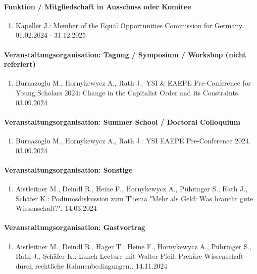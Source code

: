 \paragraph{Funktion / Mitgliedschaft in Ausschuss oder Komitee} 
\begin{enumerate}[leftmargin=*, labelsep=0.5cm] 
 	 \item Kapeller J.: Member of the Equal Opportunities Commission for Germany. 01.02.2024 - 31.12.2025 
\end{enumerate} 
\paragraph{Veranstaltungsorganisation: Tagung / Symposium / Workshop (nicht referiert)} 
\begin{enumerate}[leftmargin=*, labelsep=0.5cm] 
 	 \item Burnazoglu M., Hornykewycz A., Rath J.: YSI & EAEPE Pre-Conference for Young Scholars 2024: Change in the Capitalist Order and its Constraints. 03.09.2024 
\end{enumerate} 
\paragraph{Veranstaltungsorganisation: Summer School / Doctoral Colloquium} 
\begin{enumerate}[leftmargin=*, labelsep=0.5cm] 
 	 \item Burnazoglu M., Hornykewycz A., Rath J.: YSI EAEPE Pre-Conference 2024. 03.09.2024 
\end{enumerate} 
\paragraph{Veranstaltungsorganisation: Sonstige} 
\begin{enumerate}[leftmargin=*, labelsep=0.5cm] 
 	 \item Aistleitner M., Deindl R., Heine F., Hornykewycz A., Pühringer S., Rath J., Schäfer K.: Podiumsdiskussion zum Thema "Mehr als Geld: Was braucht gute Wissenschaft?". 14.03.2024 
\end{enumerate} 
\paragraph{Veranstaltungsorganisation: Gastvortrag} 
\begin{enumerate}[leftmargin=*, labelsep=0.5cm] 
 	 \item Aistleitner M., Deindl R., Hager T., Heine F., Hornykewycz A., Pühringer S., Rath J., Schäfer K.: Lunch Lecture mit Walter Pfeil: Prekäre Wissenschaft durch rechtliche Rahmenbedingungen.. 14.11.2024 
\end{enumerate} 
